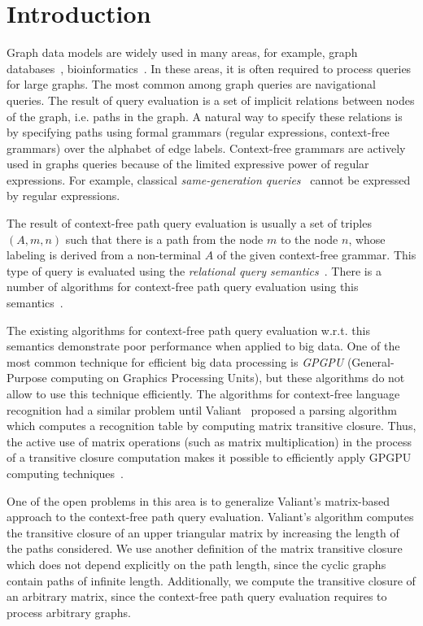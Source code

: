\section{Introduction}
Graph data models are widely used in many areas, for example, graph databases~\cite{graphDB}, bioinformatics~\cite{Bio}. In these areas, it is often required to process queries for large graphs. The most common among graph queries are navigational queries. The result of query evaluation is a set of implicit relations between nodes of the graph, i.e. paths in the graph. A natural way to specify these relations is by specifying paths using formal grammars (regular expressions, context-free grammars) over the alphabet of edge labels. Context-free grammars are actively used in graphs queries because of the limited expressive power of regular expressions. For example, classical \textit{same-generation queries}~\cite{FndDB} cannot be expressed by regular expressions.

The result of context-free path query evaluation is usually a set of triples $(A, m, n)$ such that there is a path from the node $m$ to the node $n$, whose labeling is derived from a non-terminal $A$ of the given context-free grammar. This type of query is evaluated using the \textit{relational query semantics}~\cite{hellingsRelational}. There is a number of algorithms for context-free path query evaluation using this semantics~\cite{GLL, hellingsRelational, RDF, GraphQueryWithEarley}.

The existing algorithms for context-free path query evaluation w.r.t. this semantics demonstrate poor performance when applied to big data. One of the most common technique for efficient big data processing is \textit{GPGPU} (General-Purpose computing on Graphics Processing Units), but these algorithms do not allow to use this technique efficiently. The algorithms for context-free language recognition had a similar problem until Valiant~\cite{valiant} proposed a parsing algorithm which computes a recognition table by computing matrix transitive closure. Thus, the active use of matrix operations (such as matrix multiplication) in the process of a transitive closure computation makes it possible to efficiently apply GPGPU computing techniques~\cite{matricesOnGPGPU}.

One of the open problems in this area is to generalize Valiant's matrix-based approach to the context-free path query evaluation. Valiant's algorithm computes the transitive closure of an upper triangular matrix by increasing the length of the paths considered. We use another definition of the matrix transitive closure which does not depend explicitly on the path length, since the cyclic graphs contain paths of infinite length. Additionally, we compute the transitive closure of an arbitrary matrix, since the context-free path query evaluation requires to process arbitrary graphs. 

